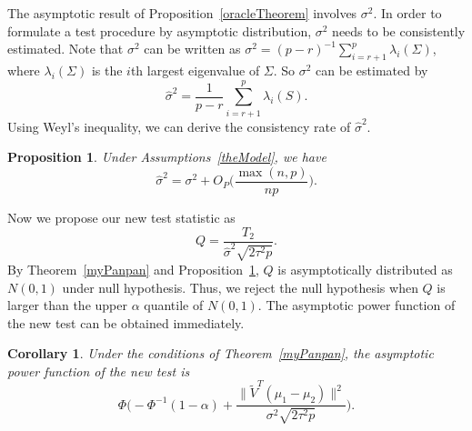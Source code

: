 \documentclass[review]{elsarticle}
\theoremstyle{plain}
\newtheorem{proposition}{\quad\quad Proposition}
\newtheorem{corollary}{\quad\quad Corollary}
\theoremstyle{definition}
\newtheorem{remark}{\quad\quad Remark}
\theoremstyle{remark}
\begin{document}


The asymptotic result of Proposition~\ref{oracleTheorem} involves $\sigma^2$.
In order to formulate a test procedure by asymptotic distribution, $\sigma^2$ needs to be consistently estimated.
Note that $\sigma^2$ can be written as
    $\sigma^2={(p-r)}^{-1}\sum_{i=r+1}^{p}\lambda_i(\Sigma)$, where $\lambda_i(\Sigma)$ is the $i$th largest eigenvalue of $\Sigma$.
So $\sigma^2$ can be estimated by
\begin{equation*}
    \hat{\sigma}^2=\frac{1}{p-r}\sum_{i=r+1}^{p} \lambda_i(S).
\end{equation*}
 Using Weyl's inequality, we can derive the consistency rate of $\hat{\sigma}^2$.
\begin{proposition}\label{varianceEstimation}
    Under Assumptions~\ref{theModel}, we have %
    $$
    \hat{\sigma}^2=\sigma^2 + O_P\Big(\frac{\max (n,p)}{np}\Big).
    $$
\end{proposition}
Now we propose our new test statistic as
    $$
    Q=\frac{T_2}{\hat{\sigma}^2\sqrt{2\tau^2 p}}.
    $$
By Theorem~\ref{myPanpan} and Proposition~\ref{varianceEstimation}, $Q$ is asymptotically distributed as $N(0,1)$ under null hypothesis.
Thus, we reject the null hypothesis when $Q$ is larger than the upper $\alpha$ quantile of $N(0,1)$.
The asymptotic power function of the new test can be obtained immediately.
\begin{corollary}\label{testPowerh}
    Under the conditions of Theorem~\ref{myPanpan}, the asymptotic power function of the new test is
    \begin{equation*}
        \Phi\Big(-\Phi^{-1}(1-\alpha)+\frac{\|\tilde{V}^T(\mu_1-\mu_2)\|^2}{\sigma^2\sqrt{2\tau^2p}}\Big).
    \end{equation*}
\end{corollary}
\end{document}
